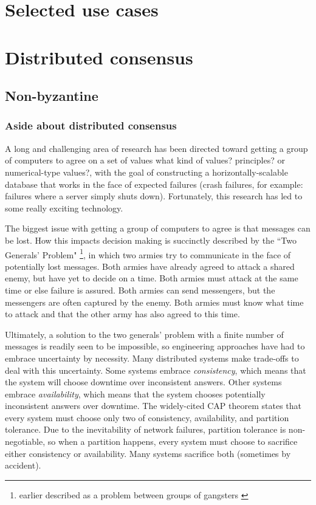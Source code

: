 \documentclass[11pt,fleqn,openany]{book}
\newcommand{\bs}[1]{{\color{red}#1}}
\begin{document}
\chapter{Selected use cases}





\chapter{Distributed consensus}

\section{Non-byzantine}

\subsection{Aside about distributed consensus}

A long and challenging area of research has been directed toward getting a
group of computers to agree on a set of values
\bs{what kind of values? principles? or numerical-type values?},
with the goal of constructing a
horizontally-scalable database that works in the face of expected failures
(crash failures, for example: failures where a server simply shuts down).
Fortunately, this research has led to some really exciting technology.

The biggest issue with getting a group of computers to agree is that messages
can be lost. How this impacts decision making is succinctly described by the
``Two Generals' Problem" \cite{two-generals}
\footnote{earlier described as a problem
between groups of gangsters \cite{two-gangsters}}, in which two armies try to
communicate in the face of potentially lost messages. Both armies have already
agreed to attack a shared enemy, but have yet to decide on a time. Both armies
must attack at the same time or else failure is assured. Both armies can send
messengers, but the messengers are often captured by the enemy. Both armies must
know what time to attack and that the other army has also agreed to this time.

Ultimately, a solution to the two generals' problem with a finite number of
messages is readily seen to be impossible, so engineering approaches have had
to embrace uncertainty by necessity. Many distributed systems make trade-offs to
deal with this uncertainty. Some systems embrace {\em consistency}, which means
that the system will choose downtime over inconsistent answers. Other
systems embrace {\em availability}, which means that the system chooses
potentially inconsistent answers over downtime. The widely-cited CAP
theorem \cite{cap} states that every system must choose only two of consistency,
availability, and partition tolerance. Due to the inevitability of network
failures, partition tolerance is non-negotiable, so when a partition happens,
every system must choose to sacrifice either consistency or availability. Many
systems sacrifice both (sometimes by accident).
\end{document}
